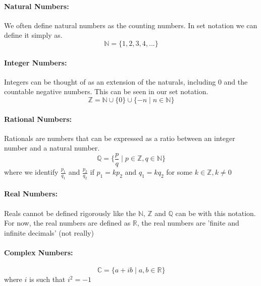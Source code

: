 \documentclass[a4paper, notitlepage]{report}
\theoremstyle{remark}
\theoremstyle{definition}
\begin{document}
            \paragraph{Natural Numbers:}%
            \label{par:natural_numbers} We often define natural numbers as the
	    counting numbers. In set notation we can define it simply as.
            $$\mathbb{N} = \{1, 2 ,3, 4, ...\}$$
	    \paragraph{Integer Numbers:}%
	    \label{par:integer_numbers} 
	    Integers can be thought of as an extension of the naturals,
	    including 0 and the countable negative numbers. This can be seen in
	    our set notation.
            $$\mathbb{Z} = \mathbb{N} \cup \{0\} \cup \{-n \mid n \in \mathbb{N}\}$$
	    \paragraph{Rational Numbers:}%
	    \label{par:rational_numbers_} 
	    Rationals are numbers that can be expressed as a ratio between an
	    integer number and a natural number.
            $$\mathbb{Q} = \{\frac{p}{q} \mid p \in \mathbb{Z}, q \in \mathbb{N}\}$$
            where we identify $\frac{p_1}{q_1}$ and $\frac{p_2}{q_2}$ if $p_1 = kp_2$ and $q_1 = kq_2$ for some $k \in \mathbb{Z}, k \neq 0$\\
            \paragraph{Real Numbers:}%
            \label{par:real_numbers_}
	    Reals cannot be defined rigorously like the $\mathbb{N}$,
	    $\mathbb{Z}$ and $\mathbb{Q}$ can be with this notation. For now,
	    the real numbers are defined as $\mathbb{R}$, the real numbers are
	    'finite and infinite decimals' (not really) \\
	    \paragraph{Complex Numbers:}%
	    \label{par:complex_numbers}
            $$\mathbb{C} = \{a + ib \mid a,b \in \mathbb{R}\}$$ 
            where $i$ is such that $i^2 = -1$
\end{document}
